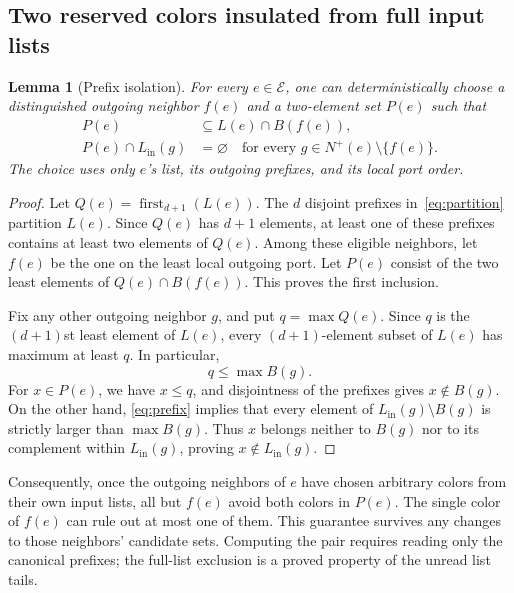 \documentclass[11pt,a4paper]{article}
\numberwithin{equation}{section}
\newtheorem{lemma}[theorem]{Lemma}
\newcommand{\Nout}{N^{+}}
\newcommand{\Lin}{L_{\mathrm{in}}}
\newcommand{\exc}{\mathcal E}
\newcommand{\first}{\operatorname{first}}
\begin{document}
\subsection{Two reserved colors insulated from full input lists}

\begin{lemma}[Prefix isolation]
\label{lem:isolation}
For every \(e\in\exc\), one can deterministically choose a
distinguished outgoing neighbor \(f(e)\) and a two-element set
\(P(e)\) such that
\begin{equation}
 \begin{split}
 P(e)&\subseteq L(e)\cap B(f(e)),\\
 P(e)\cap\Lin(g)&=\varnothing
 \quad\text{for every }g\in\Nout(e)\setminus\{f(e)\}.
 \end{split}
 \label{eq:isolation}
\end{equation}
The choice uses only \(e\)'s list, its outgoing prefixes, and its
local port order.
\end{lemma}
\begin{proof}
Let \(Q(e)=\first_{d+1}(L(e))\).
The \(d\) disjoint prefixes in~\eqref{eq:partition} partition \(L(e)\).
Since \(Q(e)\) has \(d+1\) elements, at least one of these prefixes
contains at least two elements of \(Q(e)\). Among these eligible
neighbors, let \(f(e)\) be the one on the least local outgoing port.
Let \(P(e)\) consist of the two least elements of
\(Q(e)\cap B(f(e))\). This proves the first inclusion.

Fix any other outgoing neighbor \(g\), and put \(q=\max Q(e)\).
Since \(q\) is the \((d+1)\)st least element of \(L(e)\), every
\((d+1)\)-element subset of \(L(e)\) has maximum at least \(q\).
In particular,
\[
 q\leq\max B(g).
\]
For \(x\in P(e)\), we have \(x\leq q\), and disjointness of the
prefixes gives \(x\notin B(g)\).
On the other hand, \eqref{eq:prefix} implies that every element of
\(\Lin(g)\setminus B(g)\) is strictly larger than \(\max B(g)\).
Thus \(x\) belongs neither to \(B(g)\) nor to its complement within
\(\Lin(g)\), proving \(x\notin\Lin(g)\).
\end{proof}

Consequently, once the outgoing neighbors of \(e\) have chosen
arbitrary colors from their own input lists, all but \(f(e)\) avoid
both colors in \(P(e)\). The single color of \(f(e)\) can rule out
at most one of them. This guarantee survives any changes to those
neighbors' candidate sets. Computing the pair requires reading
only the canonical prefixes; the full-list exclusion is a proved
property of the unread list tails.
\end{document}
